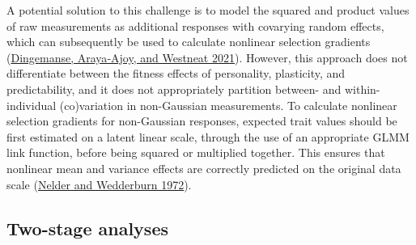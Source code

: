 \documentclass{article}
\begin{document}
A potential solution to this challenge is to model the squared and
product values of raw measurements as additional responses with
covarying random effects, which can subsequently be used to calculate
nonlinear selection gradients
(\protect\hyperlink{ref-Ding2021}{Dingemanse, Araya‐Ajoy, and Westneat
2021}). However, this approach does not differentiate between the
fitness effects of personality, plasticity, and predictability, and it
does not appropriately partition between- and within-individual
(co)variation in non-Gaussian measurements. To calculate nonlinear
selection gradients for non-Gaussian responses, expected trait values
should be first estimated on a latent linear scale, through the use of
an appropriate GLMM link function, before being squared or multiplied
together. This ensures that nonlinear mean and variance effects are
correctly predicted on the original data scale
(\protect\hyperlink{ref-Nelder1972}{Nelder and Wedderburn 1972}).

\hypertarget{two-stage-analyses}{%
\subsection{Two-stage analyses}\label{two-stage-analyses}}
\end{document}
